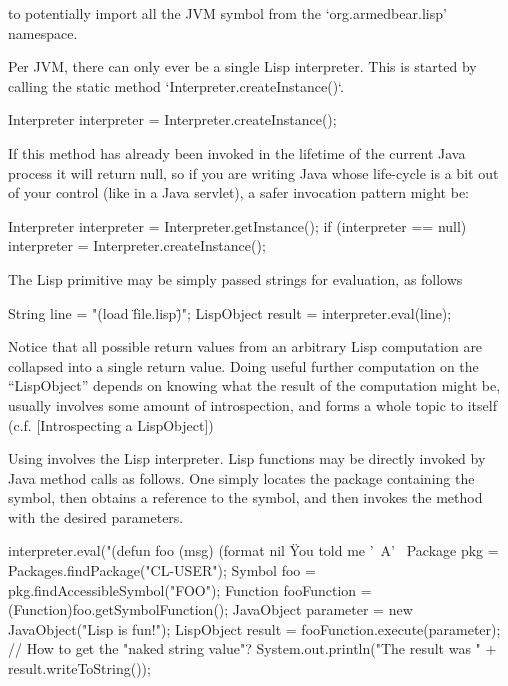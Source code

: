 \documentclass[10pt]{book}
\begin{document}
to potentially import all the JVM symbol from the `org.armedbear.lisp'
namespace.

Per JVM, there can only ever be a single Lisp interpreter.  This is
started by calling the static method `Interpreter.createInstance()`.

\begin{listing-java}
  Interpreter interpreter = Interpreter.createInstance();
\end{listing-java}

If this method has already been invoked in the lifetime of the current
Java process it will return null, so if you are writing Java whose
life-cycle is a bit out of your control (like in a Java servlet), a
safer invocation pattern might be:

\begin{listing-java}
  Interpreter interpreter = Interpreter.getInstance();
  if (interpreter == null) {
    interpreter = Interpreter.createInstance();
  }
\end{listing-java}


The Lisp  primitive may be simply passed strings for evaluation,
as follows

\begin{listing-java}
  String line = "(load \"file.lisp\")";
  LispObject result = interpreter.eval(line);
\end{listing-java}

Notice that all possible return values from an arbitrary Lisp
computation are collapsed into a single return value.  Doing useful
further computation on the ``LispObject'' depends on knowing what the
result of the computation might be, usually involves some amount
of  introspection, and forms a whole topic to itself
(c.f. [Introspecting a LispObject])

Using  involves the Lisp interpreter.  Lisp functions may
be directly invoked by Java method calls as follows.  One simply
locates the package containing the symbol, then obtains a reference to
the symbol, and then invokes the  method with the
desired parameters.

\begin{listing-java}
    interpreter.eval("(defun foo (msg) (format nil \"You told me '~A'~%
    Package pkg = Packages.findPackage("CL-USER");
    Symbol foo = pkg.findAccessibleSymbol("FOO"); 
    Function fooFunction = (Function)foo.getSymbolFunction();
    JavaObject parameter = new JavaObject("Lisp is fun!");
    LispObject result = fooFunction.execute(parameter);
    // How to get the "naked string value"?
    System.out.println("The result was " + result.writeToString()); 
\end{listing-java}
\end{document}
